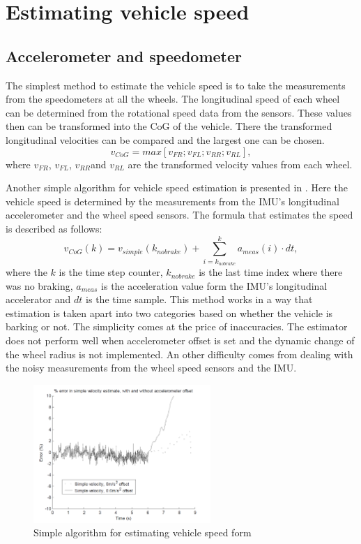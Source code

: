 \section{Estimating vehicle speed}

\subsection{Accelerometer and speedometer}
The simplest method to estimate the vehicle speed is to take the measurements from the speedometers at all the wheels. The longitudinal speed of each wheel can be determined from the rotational speed data from the sensors. These values then can be transformed into the CoG of the vehicle. There the transformed longitudinal velocities can be compared and the largest one can be chosen.
\begin{equation}
    v_{CoG} = max[v_{FR}; v_{FL}; v_{RR}; v_{RL}],
\end{equation}
where $v_{FR}$, $v_{FL}$, $v_{RR}$and $v_{RL}$ are the transformed velocity values from each wheel. 

Another simple algorithm for vehicle speed estimation is presented in \cite{lit_simple_veh_speed}. Here the vehicle speed is determined by the measurements from the IMU's longitudinal accelerometer and the wheel speed sensors. The formula that estimates the speed is described as follows:
\begin{equation}
    v_{CoG}(k) = v_{simple}(k_{nobrake}) + \sum_{i=k_{nobrake}}^{k} a_{meas}(i)\cdot dt,
\end{equation}
where the $k$ is the time step counter, $k_{nobrake}$ is the last time index where there was no braking, $a_{meas}$ is the acceleration value form the IMU's longitudinal accelerator and $dt$ is the time sample. This method works in a way that estimation is taken apart into two categories based on whether the vehicle is barking or not. 
The simplicity comes at the price of inaccuracies. The estimator does not perform well when accelerometer offset is set and the dynamic change of the wheel radius is not implemented. An other difficulty comes from dealing with the noisy measurements from the wheel speed sensors and the IMU. 
\FloatBarrier
\begin{figure}[ht]
    \centering
    \includegraphics[width=0.6\textwidth]{images/simple_estimator.png}
    \caption{Simple algorithm for estimating vehicle speed form \cite{lit_simple_veh_speed}}
    \label{fig:simple_veh_speed_est}
\end{figure}
\FloatBarrier

